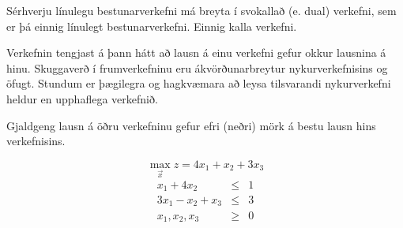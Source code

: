 \lstset{language=awk}

Sérhverju línulegu bestunarverkefni má breyta í svokallað  (e. dual) verkefni, sem er þá einnig línulegt bestunarverkefni. Einnig kalla  verkefni. 

Verkefnin tengjast á þann hátt að lausn á einu verkefni gefur okkur lausnina á hinu. Skuggaverð í frumverkefninu eru ákvörðunarbreytur nykurverkefnisins og öfugt. Stundum er þægi\-legra og hagkvæmara að leysa tilsvarandi nykurverkefni heldur en upphaflega verkefnið.

Gjaldgeng lausn á öðru verkefninu gefur efri (neðri) mörk á bestu lausn hins verkefnisins. 

\begin{daemi}\label{daemi:efrinedrimork}
$$\max_{\vec{x}} z=4x_1+x_2+3x_3 $$
\begin{eqnarray}
x_1+4x_2&\leq&1\\ \label{sk:11}
3x_1-x_2+x_3&\leq&3\\ \label{sk:12}
x_1,x_2,x_3&\geq&0 \nonumber
\end{eqnarray}
\end{daemi}
